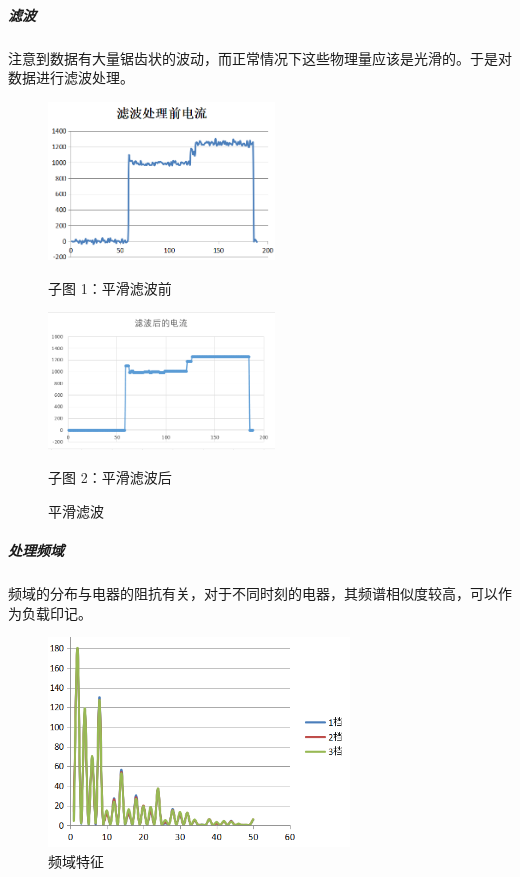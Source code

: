\documentclass[UTF8]{article}
\begin{document}
\subparagraph{滤波}
\indent 注意到数据有大量锯齿状的波动，而正常情况下这些物理量应该是光滑的。于是对数据进行滤波处理。
\begin{figure}[htbp]
\centering
\begin{minipage}[htbp]{7cm}
\centering
\includegraphics[width=6cm]{f1.png}
\caption*{子图 1：平滑滤波前}
\end{minipage}
\begin{minipage}[htbp]{7cm}
\centering
\includegraphics[width=6cm]{f2.png}
\caption*{子图 2：平滑滤波后}
\end{minipage}
\caption{平滑滤波}
\end{figure}

\subparagraph{处理频域}
\indent 频域的分布与电器的阻抗有关，对于不同时刻的电器，其频谱相似度较高，可以作为负载印记。
\begin{figure}[htbp]
\small
\centering
\includegraphics[width=8cm]{h.png}
\caption{频域特征}
\end{figure}
\end{document}
